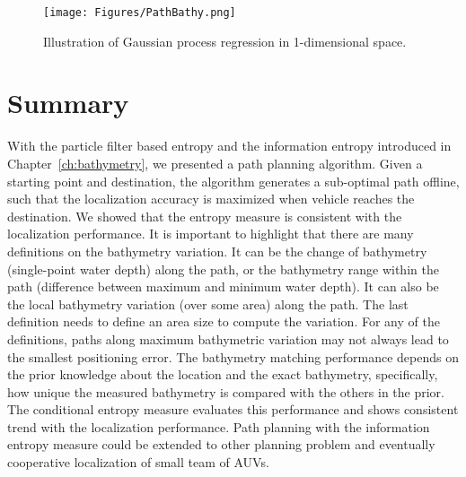 \begin{figure}[htbp]
\centering
\texttt{[image: Figures/PathBathy.png]}
\caption{Illustration of Gaussian process regression in 1-dimensional space.}
\label{fig:PathBathy}
\end{figure}

\section{Summary} 

With the particle filter based entropy and the information entropy introduced in Chapter~\ref{ch:bathymetry}, we presented a path planning algorithm. Given a starting point and destination, the algorithm generates a sub-optimal path offline, such that the localization accuracy is maximized when vehicle reaches the destination. We showed that the entropy measure is consistent with the localization performance. It is important to highlight that there are many definitions on the bathymetry variation. It can be the change of bathymetry (single-point water depth) along the path, or the bathymetry range within the path (difference between maximum and minimum water depth). It can also be the local bathymetry variation (over some area) along the path. The last definition needs to define an area size to compute the variation. For any of the definitions, paths along maximum bathymetric variation may not always lead to the smallest positioning error. The bathymetry matching performance depends on the prior knowledge about the location and the exact bathymetry, specifically, how unique the measured bathymetry is compared with the others in the prior. The conditional entropy measure evaluates this performance and shows consistent trend with the localization performance. Path planning with the information entropy measure could be extended to other planning problem and eventually cooperative localization of small team of AUVs.